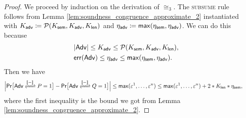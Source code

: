 \begin{proof}
We proceed by induction on the derivation of $\cong_3$. The \textsc{subsume} rule follows from Lemma \ref{lem:soundness_congruence_approximate_2} instantiated with $K_{\mathsf{adv}} \coloneqq \mathcal{P}(K_{\mathsf{sem}},K_{\mathsf{adv}},K_{\mathsf{len}})$ and $\eta_{\mathsf{adv}} \coloneqq \mathsf{max}(\eta_{\mathsf{sem}},\eta_{\mathsf{adv}})$. We can do this because
\begin{align*}
& |\mathsf{Adv}| \leq K_{\mathsf{adv}} \leq \mathcal{P}(K_{\mathsf{sem}},K_{\mathsf{adv}},K_{\mathsf{len}}), \\
& \mathsf{err}(\mathsf{Adv}) \leq \eta_{\mathsf{adv}} \leq \mathsf{max}(\eta_{\mathsf{sem}},\eta_{\mathsf{adv}}).
\end{align*}
Then we have
\begin{align*}
\Big|\mathsf{Pr}\big[\interaction{\Adv}{P}{\int{-}} = 1\big] - \mathsf{Pr}\big[\interaction{\Adv}{Q}{\int{-}} = 1\big]\Big| & \leq \max(\varepsilon^1,\ldots,\varepsilon^n) \leq \max(\varepsilon^1,\ldots,\varepsilon^n) + 2 * K_\length * \eta_\sem,
\end{align*}
where the first inequality is the bound we got from Lemma \ref{lem:soundness_congruence_approximate_2}.


\end{proof}
